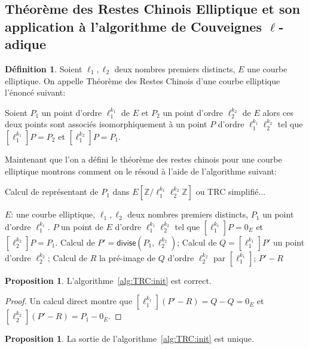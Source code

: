 \documentclass[10pt,a4paper]{book}
\theoremstyle{plain}
\theoremstyle{definition}
\theoremstyle{definition}
\theoremstyle{definition}
\newtheorem{prop}[thm]{Proposition}
\theoremstyle{definition}
\newtheorem{defi}[thm]{Définition}
\theoremstyle{remark}
\theoremstyle{remark}
\theoremstyle{definition}
\begin{document}
\subsection{Théorème des Restes Chinois Elliptique et son application à l'algorithme de Couveignes $\ell$-adique}
\label{sub:TRCE:cou}
\begin{defi}
Soient $\ell_1, \ell_2$ deux nombres premiers distincts, $E$ une courbe elliptique. On appelle Théorème des Restes Chinois d'une courbe elliptique l'énoncé suivant:

Soient $P_1$ un point d'ordre $\ell_1^{k_1}$ de $E$ et $P_2$ un point d'ordre $\ell_2^{k_2}$ de $E$ alors ces deux points sont associés isomorphiquement à un point $P$ d'ordre $\ell_1^{k_1}\ell_2^{k_2}$ tel que $[\ell_1^{k_1}]P=P_2$ et $[\ell_1^{k_2}]P=P_1$.
\end{defi}

Maintenant que l'on a défini le théorème des restes chinois pour une courbe elliptique montrons comment on le résoud à l'aide de l'algorithme suivant:
\begin{algorithm}
\caption{\label{alg:TRC:init}Calcul de  représentant de $P_1$ dans $E[\mathbb{Z}/\ell_1^{k_1}\ell_2^{k_2}\mathbb{Z}]$ ou TRC simplifié...}
\begin{algorithmic}[1]
\REQUIRE $E$: une courbe elliptique, $\ell_1,\ell_2$ deux nombres premiers distincts, $P_1$ un point d'ordre $\ell_1^{k_1}$.
\ENSURE $P$ un point de $E$ d'ordre $\ell_1^{k_1}\ell_2^{k_2}$  tel que $[\ell_1^{k_1}]P=0_E$ et $[\ell_2^{k_2}]P=P_1$.
\STATE \label{alg:TRC:init:div} Calcul de $P'=\mathsf{divise}(P_1,\ell_2^{k_2})$;
\STATE \label{alg:TRC:init:mul} Calcul de $Q=[\ell_1^{k_1}]P'$ un point d'ordre $\ell_2^{k_2}$;
\STATE \label{alg:TRC:init:prim} Calcul de $R$ la pré-image de $Q$ d'ordre $\ell_2^{k_2}$ par $[\ell_1^{k_1}]$;
\RETURN $P'-R$
\end{algorithmic}
\end{algorithm}

\begin{prop}
L'algorithme~\ref{alg:TRC:init} est correct.
\end{prop}

\begin{proof}
Un calcul direct montre que $[\ell_1^{k_1}](P'-R)=Q-Q=0_E$ et 
 $[\ell_2^{k_2}](P'-R)=P_1-0_E$.
\end{proof}

\begin{prop}
La sortie de l'algorithme~\ref{alg:TRC:init} est unique.
\end{prop}
\end{document}
